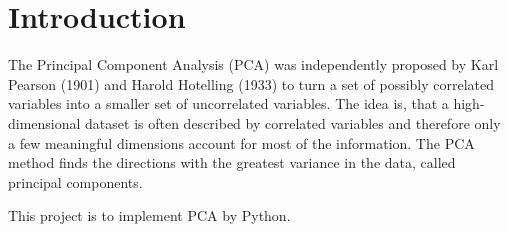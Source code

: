 \chapter{Introduction}
The Principal Component Analysis (PCA) was independently proposed by Karl Pearson
(1901) and Harold Hotelling (1933) to turn a set of possibly correlated variables
into a smaller set of uncorrelated variables. The idea is, that a high-dimensional
dataset is often described by correlated variables and therefore only a few
meaningful dimensions account for most of the information. The PCA method finds
the directions with the greatest variance in the data, called principal components.

This project is to implement PCA by Python.
